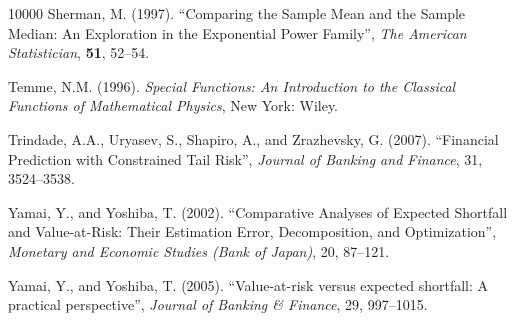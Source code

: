 \documentclass[11pt]{article}
\begin{document}
\begin{thebibliography}{10000}
Sherman, M. (1997). ``Comparing the Sample Mean and the Sample Median: An Exploration in the Exponential Power
Family'', \emph{The American Statistician}, \textbf{51}, 52--54. 

Temme, N.M. (1996). \emph{Special Functions:  An Introduction to the
  Classical Functions of Mathematical Physics}, New York: Wiley.


Trindade, A.A., Uryasev, S., Shapiro, A., and Zrazhevsky, G. (2007). ``Financial Prediction with Constrained Tail Risk'', \emph{Journal of Banking and Finance}, 31, 3524--3538.

Yamai, Y., and Yoshiba, T. (2002). ``Comparative Analyses of Expected
Shortfall and Value-at-Risk: Their Estimation Error, Decomposition,
and Optimization'', \emph{Monetary and Economic Studies (Bank of Japan)}, 20, 87--121.


Yamai, Y., and Yoshiba, T. (2005). ``Value-at-risk versus expected
shortfall: A practical perspective'', \emph{Journal of Banking \& Finance}, 29, 997--1015.




\end{thebibliography}





\appendix
\end{document}

